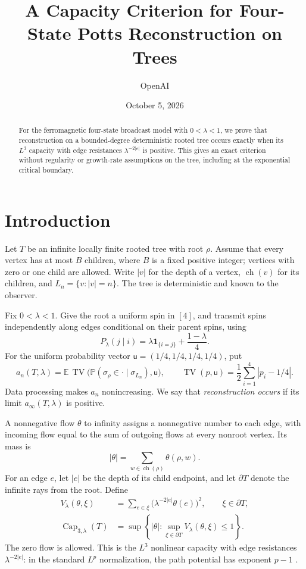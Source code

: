\documentclass[11pt]{article}
\title{A Capacity Criterion for Four-State Potts Reconstruction on Trees}
\author{OpenAI}
\date{October 5, 2026}
\numberwithin{equation}{section}
\newcommand{\E}{\mathbb E}
\newcommand{\Prob}{\mathbb P}
\newcommand{\unif}{\mathsf u}
\newcommand{\Capacity}{\operatorname{Cap}}
\newcommand{\TV}{\operatorname{TV}}
\newcommand{\children}{\operatorname{ch}}
\begin{document}
\maketitle

\begin{abstract}
For the ferromagnetic four-state broadcast model with $0<\lambda<1$,
we prove that reconstruction on a bounded-degree deterministic rooted
tree occurs exactly when its $L^3$ capacity with edge resistances
$\lambda^{-2|e|}$ is positive. This gives an exact criterion without
regularity or growth-rate assumptions on the tree, including at the
exponential critical boundary.
\end{abstract}

\section{Introduction}
\label{sec:introduction}

Let $T$ be an infinite locally finite rooted tree with root $\rho$.
Assume that every vertex has at most $B$ children, where $B$ is a
fixed positive integer; vertices with zero or one child are allowed.
Write $|v|$ for the depth of a vertex, $\children(v)$ for its
children, and $L_n=\{v:|v|=n\}$. The tree is deterministic and
known to the observer.

Fix $0<\lambda<1$. Give the root a uniform spin in $[4]$, and
transmit spins independently along edges conditional on their
parent spins, using
\begin{equation}\label{eq:channel}
 P_\lambda(j\mid i)
 =\lambda\mathbf1_{\{i=j\}}+\frac{1-\lambda}{4}.
\end{equation}
For the uniform probability vector $\unif=(1/4,1/4,1/4,1/4)$, put
\[
 a_n(T,\lambda)=
 \E\,\TV\bigl(\Prob(\sigma_\rho\in\cdot\mid\sigma_{L_n}),
                    \unif\bigr),
 \qquad
 \TV(p,\unif)=\frac12\sum_{i=1}^4|p_i-1/4|.
\]
Data processing makes $a_n$ nonincreasing. We say that
\emph{reconstruction occurs} if its limit $a_\infty(T,\lambda)$
is positive.

A nonnegative flow $\theta$ to infinity assigns a nonnegative
number to each edge, with incoming flow equal to the sum of outgoing
flows at every nonroot vertex. Its mass is
\[
 |\theta|=\sum_{w\in\children(\rho)}\theta(\rho,w).
\]
For an edge $e$, let $|e|$ be the depth of its child endpoint,
and let $\partial T$ denote the infinite rays from the root.
Define
\begin{align}
 V_\lambda(\theta,\xi)
   &=\sum_{e\in\xi}\bigl(\lambda^{-2|e|}\theta(e)\bigr)^2,
       \qquad \xi\in\partial T,\label{eq:potential}\\
 \Capacity_{3,\lambda}(T)
   &=\sup\left\{|\theta|:
       \sup_{\xi\in\partial T}V_\lambda(\theta,\xi)\leq1\right\}.
       \label{eq:capacity}
\end{align}
The zero flow is allowed. This is the $L^3$ nonlinear capacity
with edge resistances $\lambda^{-2|e|}$: in the standard $L^p$
normalization, the path potential has exponent $p-1$
\cite[Section~2]{PP10}.
\end{document}
